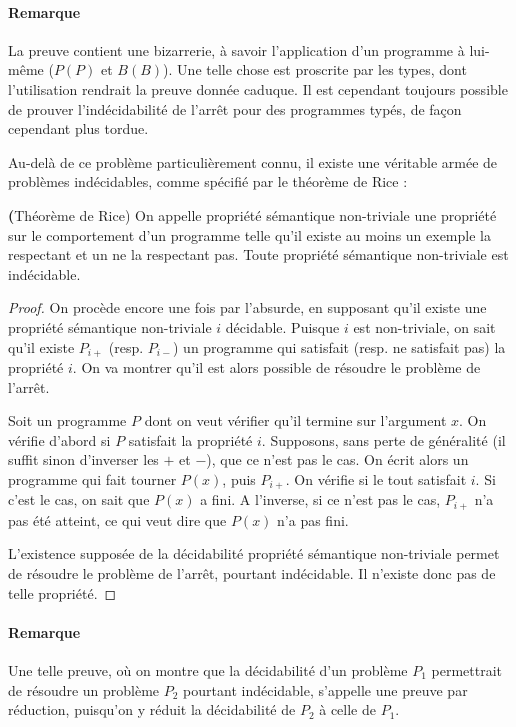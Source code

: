 \paragraph{Remarque} La preuve contient une bizarrerie, à savoir l'application d'un programme à lui-même ($P(P)$ et $B(B)$). Une telle chose est proscrite par les types, dont l'utilisation rendrait la preuve donnée caduque. Il est cependant toujours possible de prouver l'indécidabilité de l'arrêt pour des programmes typés, de façon cependant plus tordue.


Au-delà de ce problème particulièrement connu, il existe une véritable armée de problèmes indécidables, comme spécifié par le théorème de Rice :


\begin{theorem}{\textbf(Théorème de Rice)} On appelle propriété sémantique non-triviale une propriété sur le comportement d'un programme telle qu'il existe au moins un exemple la respectant et un ne la respectant pas. Toute propriété sémantique non-triviale est indécidable.
\end{theorem}

\begin{proof}
On procède encore une fois par l'absurde, en supposant qu'il existe une propriété sémantique non-triviale $i$ décidable. Puisque $i$ est non-triviale, on sait qu'il existe $P_{i+}$ (resp. $P_{i-}$) un programme qui satisfait (resp. ne satisfait pas) la propriété $i$. On va montrer qu'il est alors possible de résoudre le problème de l'arrêt.

Soit un programme $P$ dont on veut vérifier qu'il termine sur l'argument $x$. On vérifie d'abord si $P$ satisfait la propriété $i$. Supposons, sans perte de généralité (il suffit sinon d'inverser les $+$ et $-$), que ce n'est pas le cas. On écrit alors un programme qui fait tourner $P(x)$, puis $P_{i+}$. On vérifie si le tout satisfait $i$. Si c'est le cas, on sait que $P(x)$ a fini. A l'inverse, si ce n'est pas le cas, $P_{i+}$ n'a pas été atteint, ce qui veut dire que $P(x)$ n'a pas fini.

L'existence supposée de la décidabilité propriété sémantique non-triviale permet de 
résoudre le problème de l'arrêt, pourtant indécidable. Il n'existe donc pas de telle propriété.\end{proof}

\paragraph{Remarque} Une telle preuve, où on montre que la décidabilité d'un problème $P_1$ permettrait de résoudre un problème $P_2$ pourtant indécidable, s'appelle une preuve par réduction, puisqu'on y réduit la décidabilité de $P_2$ à celle de $P_1$.

